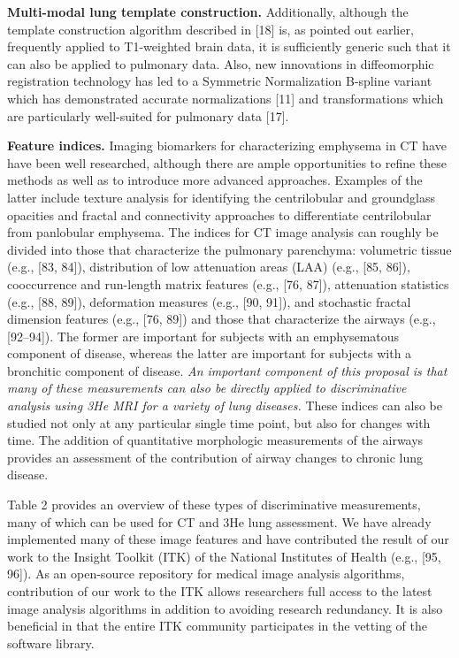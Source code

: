 \documentclass[11pt,]{article}
\begin{document}
\textbf{Multi-modal lung template construction.} Additionally, although
the template construction algorithm described in {[}18{]} is, as pointed
out earlier, frequently applied to T1-weighted brain data, it is
sufficiently generic such that it can also be applied to pulmonary data.
Also, new innovations in diffeomorphic registration technology has led
to a Symmetric Normalization B-spline variant which has demonstrated
accurate normalizations {[}11{]} and transformations which are
particularly well-suited for pulmonary data {[}17{]}.

\textbf{Feature indices.} Imaging biomarkers for characterizing
emphysema in CT have have been well researched, although there are ample
opportunities to refine these methods as well as to introduce more
advanced approaches. Examples of the latter include texture analysis for
identifying the centrilobular and groundglass opacities and fractal and
connectivity approaches to differentiate centrilobular from panlobular
emphysema. The indices for CT image analysis can roughly be divided into
those that characterize the pulmonary parenchyma: volumetric tissue
(e.g., {[}83, 84{]}), distribution of low attenuation areas (LAA) (e.g.,
{[}85, 86{]}), cooccurrence and run-length matrix features (e.g., {[}76,
87{]}), attenuation statistics (e.g., {[}88, 89{]}), deformation
measures (e.g., {[}90, 91{]}), and stochastic fractal dimension features
(e.g., {[}76, 89{]}) and those that characterize the airways (e.g.,
{[}92--94{]}). The former are important for subjects with an
emphysematous component of disease, whereas the latter are important for
subjects with a bronchitic component of disease. \emph{An important
component of this proposal is that many of these measurements can also
be directly applied to discriminative analysis using 3He MRI for a
variety of lung diseases.} These indices can also be studied not only at
any particular single time point, but also for changes with time. The
addition of quantitative morphologic measurements of the airways
provides an assessment of the contribution of airway changes to chronic
lung disease.



Table 2 provides an overview of these types of discriminative
measurements, many of which can be used for CT and 3He lung assessment.
We have already implemented many of these image features and have
contributed the result of our work to the Insight Toolkit (ITK) of the
National Institutes of Health (e.g., {[}95, 96{]}). As an open-source
repository for medical image analysis algorithms, contribution of our
work to the ITK allows researchers full access to the latest image
analysis algorithms in addition to avoiding research redundancy. It is
also beneficial in that the entire ITK community participates in the
vetting of the software library.
\end{document}
